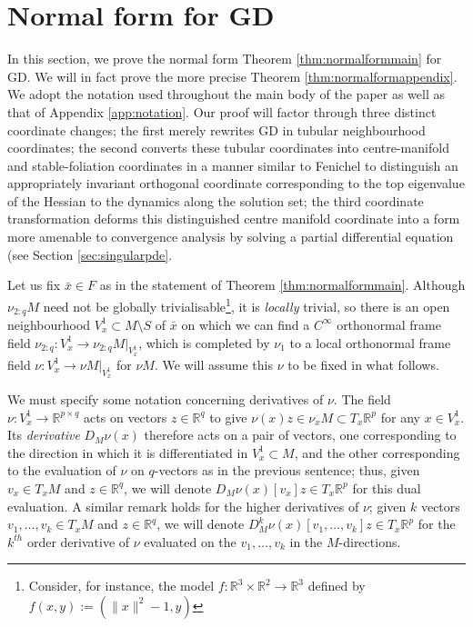 \documentclass{article}
\newcommand{\RB}{\mathbb{R}}
\newcommand{\GD}{\mathrm{GD}}
\theoremstyle{plain}
\theoremstyle{definition}
\theoremstyle{remark}
\begin{document}
\section{Normal form for GD}

In this section, we prove the normal form Theorem \ref{thm:normalformmain} for GD. We will in fact prove the more precise Theorem \ref{thm:normalformappendix}. We adopt the notation used throughout the main body of the paper as well as that of Appendix \ref{app:notation}. Our proof will factor through three distinct coordinate changes; the first merely rewrites $\GD$ in tubular neighbourhood coordinates; the second converts these tubular coordinates into centre-manifold and stable-foliation coordinates in a manner similar to Fenichel \cite{fenichel_singular} to distinguish an appropriately invariant orthogonal coordinate corresponding to the top eigenvalue of the Hessian to the dynamics along the solution set; the third coordinate transformation deforms this distinguished centre manifold coordinate into a form more amenable to convergence analysis by solving a partial differential equation (see Section \ref{sec:singularpde}.

Let us fix $\bar{x}\in F$ as in the statement of Theorem \ref{thm:normalformmain}. Although $\nu_{2:q}M$ need not be globally trivialisable\footnote{Consider, for instance, the model $f:\RB^3\times\RB^2\rightarrow\RB^3$ defined by $f(x,y):=(\|x\|^2-1,y)$}, it is \emph{locally} trivial, so there is an open neighbourhood $V^1_x\subset M\setminus S$ of $\bar{x}$ on which we can find a $C^{\infty}$ orthonormal frame field $\nu_{2:q}:V^1_x\rightarrow \nu_{2:q}M|_{V^1_x}$, which is completed by $\nu_1$ to a local orthonormal frame field $\nu:V^1_x\rightarrow \nu M|_{V^1_x}$ for $\nu M$. We will assume this $\nu$ to be fixed in what follows.

We must specify some notation concerning derivatives of $\nu$. The field $\nu:V^1_x\rightarrow \RB^{p\times q}$ acts on vectors $z\in\RB^q$ to give $\nu(x)z\in \nu_xM\subset T_x\RB^p$ for any $x\in V^1_x$. Its \emph{derivative} $D_M\nu(x)$ therefore acts on a pair of vectors, one corresponding to the direction in which it is differentiated in $V^1_x\subset M$, and the other corresponding to the evaluation of $\nu$ on $q$-vectors as in the previous sentence; thus, given $v_x\in T_xM$ and $z\in \RB^q$, we will denote $D_M\nu(x)[v_x]z\in T_x\RB^p$ for this dual evaluation. A similar remark holds for the higher derivatives of $\nu$; given $k$ vectors $v_1,\dots,v_k\in T_xM$ and $z\in \RB^q$, we will denote $D^k_M\nu(x)[v_1,\dots,v_k]z\in T_x\RB^p$ for the $k^{th}$ order derivative of $\nu$ evaluated on the $v_1,\dots,v_k$ in the $M$-directions.
\end{document}
